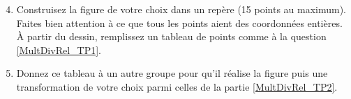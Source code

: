 \begin{TP}[Morphing]
\begin{enumerate}
 \setcounter{enumi}{3}
 \item Construisez la figure de votre choix dans un repère (15 points au maximum). Faites bien attention à ce que tous les points aient des coordonnées entières. À partir du dessin, remplissez un tableau de points comme à la question \ref{MultDivRel_TP1}.
 \item Donnez ce tableau à un autre groupe pour qu'il réalise la figure puis une transformation de votre choix parmi celles de la partie \ref{MultDivRel_TP2}.
 \end{enumerate}

\end{TP}

\newpage



